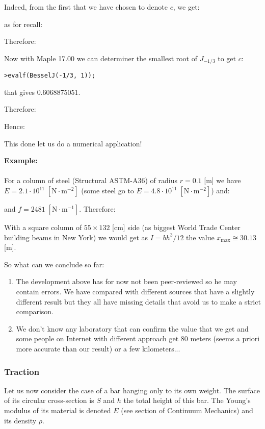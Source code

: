 	Indeed, from the first that we have chosen to denote $c$, we get:
	
	as for recall:
	
	Therefore:
	
	Now with Maple 17.00 we can determiner the smallest root of $J_{-1/3}$ to get $c$:
	
	\texttt{>evalf(BesselJ(-1/3, 1));}
	
	that gives $0.6068875051$. 
	
	Therefore:
	
	Hence:
	
	This done let us do a numerical application!
	
	\begin{tcolorbox}[colframe=black,colback=white,sharp corners]
	\textbf{{\Large {}}Example:}\\\\
	For a column of steel (Structural ASTM-A36) of radius $r=0.1$ [m] we have $E=2.1\cdot 10^{11}\;[\text{N}\cdot\text{m}^{-2}]$ (some steel go to $E=4.8\cdot 10^{11}\;[\text{N}\cdot\text{m}^{-2}]$) and:
	
	and $f=2481\;[\text{N}\cdot \text{m}^{-1}]$. Therefore:
	
	With a square column of $55\times 132$ [cm] side (as biggest World Trade Center building beams in New York) we would get as $I=bh^3/12$ the value $x_{\max}\cong 30.13$[m].
	\end{tcolorbox}
	So what can we conclude so far:
	\begin{enumerate}
		\item The development above has for now not been peer-reviewed so he may contain errors. We have compared with different sources that have a slightly different result but they all have missing details that avoid us to make a strict comparison.
		
		\item We don't know any laboratory that can confirm the value that we get and some people on Internet with different approach get $80$ meters (seems a priori more accurate than our result) or a few kilometers...
	\end{enumerate}
	
	\subsubsection{Traction}
	Let us now consider the case of a bar hanging only to its own weight. The surface of its circular cross-section is $S$ and $h$ the total height of this bar. The Young's modulus of its material is denoted $E$ ({see section of Continuum Mechanics}) and its density $\rho$.


